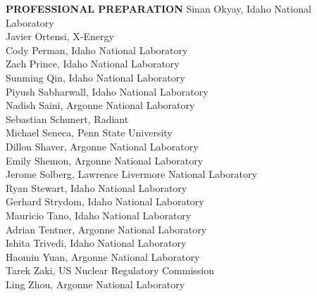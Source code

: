 \documentclass[11pt,letterpaper,english]{article}
\begin{document}
\begin{flushleft} {\bf PROFESSIONAL PREPARATION}
{Sinan Okyay, Idaho National Laboratory \\
Javier Ortensi, X-Energy \\
Cody Perman, Idaho National Laboratory \\
Zach Prince, Idaho National Laboratory \\
Sunming Qin, Idaho National Laboratory \\
Piyush Sabharwall, Idaho National Laboratory \\
Nadish Saini, Argonne National Laboratory \\
Sebastian Schunert, Radiant \\
Michael Seneca, Penn State University \\
Dillon Shaver, Argonne National Laboratory \\
Emily Shemon, Argonne National Laboratory \\
Jerome Solberg, Lawrence Livermore National Laboratory \\
Ryan Stewart, Idaho National Laboratory \\
Gerhard Strydom, Idaho National Laboratory \\
Mauricio Tano, Idaho National Laboratory \\
Adrian Tentner, Argonne National Laboratory \\
Ishita Trivedi, Idaho National Laboratory \\
Haomin Yuan, Argonne National Laboratory \\
Tarek Zaki, US Nuclear Regulatory Commission \\
Ling Zhou, Argonne National Laboratory \\

}


\end{flushleft}
\end{document}
